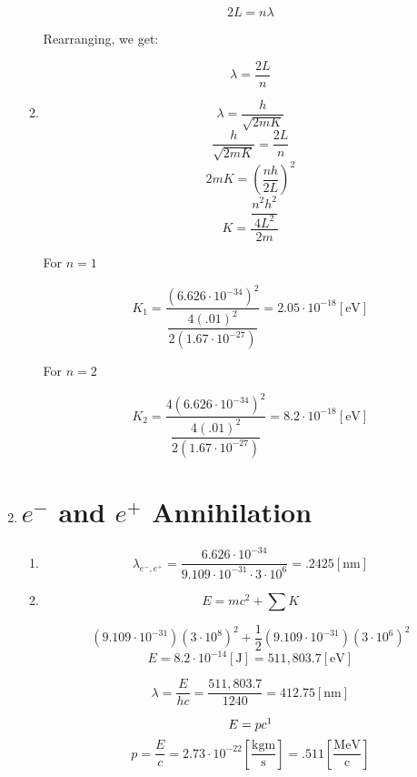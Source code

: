 \begin{enumerate}
\begin{enumerate}
        $$2L=n\lambda$$

        Rearranging, we get:

        $$\boxed{\lambda=\frac{2L}{n}}$$

      \item 

        $$\lambda=\frac{h}{\sqrt{2mK}}$$
        $$\frac{h}{\sqrt{2mK}}=\frac{2L}{n}$$
        $$2mK=\left(\dfrac{nh}{2L}\right)^2$$
        $$K=\dfrac{\dfrac{n^2h^2}{4L^2}}{2m}$$
        

        \begin{center}
          For $n=1$
        \end{center}

        $$\boxed{K_1=\dfrac{(6.626\cdot10^{-34})^2}{\dfrac{4(.01)^2}{2(1.67\cdot10^{-27})}}=2.05\cdot10^{-18}[\si{\eV}]}$$

        \begin{center}
          For $n=2$
        \end{center}

        $$\boxed{K_2=\dfrac{4(6.626\cdot10^{-34})^2}{\dfrac{4(.01)^2}{2(1.67\cdot10^{-27})}}=8.2\cdot10^{-18}[\si{\eV}]}$$

    \end{enumerate}

  \item

    \section*{$e^-$ and $e^+$ Annihilation}

    \begin{enumerate}

      \item 

        $$\boxed{\lambda_{e^-,e^+}=\frac{6.626\cdot10^{-34}}{9.109\cdot10^{-31}\cdot3\cdot10^{6}}=.2425[\si{\nano\meter}]}$$

      \item 

        $$E=mc^2+\sum K$$

        $$\left( 9.109\cdot10^{-31} \right)\left( 3\cdot10^{8} \right)^2+\frac{1}{2}\left( 9.109\cdot10^{-31} \right)\left( 3\cdot10^6 \right)^2$$
        $$\boxed{E=8.2\cdot10^{-14}[\si{\joule}]=511,803.7[\si{\eV}]}$$

        $$\boxed{\lambda=\frac{E}{hc}=\frac{511,803.7}{1240}=412.75[\si{\nano\meter}]}$$

        $$E=pc\footnote{for photons}$$
        $$\boxed{p=\frac{E}{c}=2.73\cdot10^{-22}\left[ \frac{\si{\kilo\gram\meter}}{\si{\second}} \right]=.511\left[ \frac{\si{\mega\eV}}{\text{c}} \right]}$$


\end{enumerate}
\end{enumerate}
